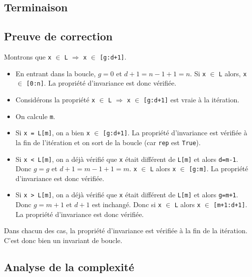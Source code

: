 \subsection{Terminaison}

\subsection{Preuve de correction}

Montrons que \lstinline{x} $\in$ \lstinline{L} $\Rightarrow$ \lstinline{x} $\in$ \lstinline{[g:d+1]}.

\begin{itemize}
\item En entrant dans la boucle, $g=0$ et $d+1=n-1+1=n$. Si \lstinline{x} $\in$ \lstinline{L} alors, \lstinline{x} $\in$ \lstinline{[0:n]}. La propriété d'invariance est donc vérifiée.

\item Considérons la propriété 
\lstinline{x} $\in$ \lstinline{L} $\Rightarrow$ \lstinline{x} $\in$ \lstinline{[g:d+1]}
est vraie à la \ieme itération.

\item On calcule \lstinline{m}.

\item Si \lstinline{x = L[m]}, on a bien \lstinline{x} $\in$ \lstinline{[g:d+1]}. La propriété d'invariance est vérifiée à la fin de l'itération et on sort de la boucle (car \lstinline{rep} est \lstinline{True}). 

\item Si \lstinline{x < L[m]}, on a déjà vérifié que \lstinline{x} était différent de \lstinline{L[m]} et alors \lstinline{d=m-1}. Donc $g=g$ et $d+1=m-1+1=m$.
\lstinline{x} $\in$ \lstinline{L} alors \lstinline{x} $\in$ \lstinline{[g:m]}. La propriété d'invariance est donc vérifiée.

\item Si \lstinline{x > L[m]}, on a déjà vérifié que \lstinline{x} était différent de \lstinline{L[m]} et alors \lstinline{g=m+1}. Donc $g=m+1$ et $d+1$ est inchangé.
 Donc si 
\lstinline{x} $\in$ \lstinline{L} alors \lstinline{x} $\in$ \lstinline{[m+1:d+1]}. La propriété d'invariance est donc vérifiée.
\end{itemize}
Dans chacun des cas, la propriété d'invariance est vérifiée à la fin de la \ieme itération. C'est donc bien un invariant de boucle. 

\subsection{Analyse de la complexité}

